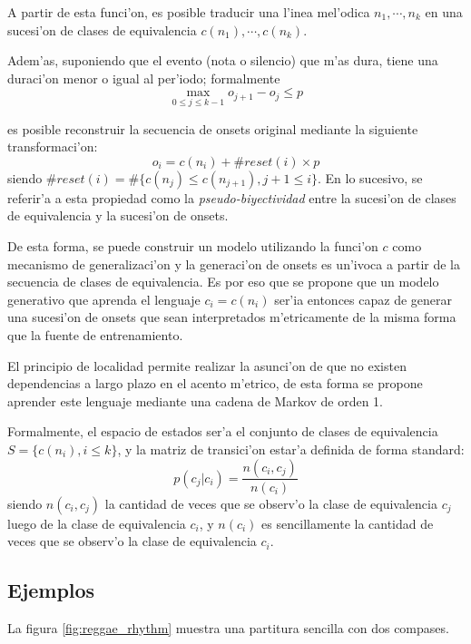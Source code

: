 \begin{imagen}
\end{imagen}

A partir de esta funci'on, es posible traducir una l'inea mel'odica $n_1,\cdots,n_k$ en una sucesi'on de clases de equivalencia $c(n_1),\cdots,c(n_k)$. 

Adem'as, suponiendo que el evento (nota o silencio) que m'as dura, tiene una duraci'on menor o igual al per'iodo; formalmente 
$$\max_{0\leq j \leq k-1}o_{j+1}-o_j \leq p$$ 

es posible reconstruir la secuencia de onsets original mediante la siguiente transformaci'on:
$$o_i=c(n_i) + \#reset(i)\times p$$ siendo $\#reset(i)=\#\{c(n_j) \leq c(n_{j+1}), j+1 \leq i\}$. 
En lo sucesivo, se referir'a a esta propiedad como la \emph{pseudo-biyectividad} entre la sucesi'on de clases de equivalencia y la sucesi'on de onsets.

De esta forma, se puede construir un modelo utilizando la funci'on $c$ como mecanismo de generalizaci'on y la generaci'on de onsets es un'ivoca a partir de la secuencia de 
clases de equivalencia. Es por eso que se propone que un modelo generativo que aprenda el lenguaje $c_i=c(n_i)$ ser'ia entonces capaz de generar una sucesi'on de onsets 
que sean interpretados m'etricamente de la misma forma que la fuente de entrenamiento. 

El principio de localidad permite realizar la asunci'on de que no existen dependencias a largo plazo en el acento m'etrico, de esta forma se propone aprender este lenguaje mediante
una cadena de Markov de orden 1. 

Formalmente, el espacio de estados ser'a el conjunto de clases de equivalencia $S=\{c(n_i), i\leq k \}$, y la matriz de transici'on estar'a definida de forma standard:
$$p(c_j|c_i) = \frac{n(c_i, c_j)}{n(c_i)}$$
siendo $n(c_i, c_j)$ la cantidad de veces que se observ'o la clase de equivalencia $c_j$ luego de la clase de equivalencia $c_i$, y $n(c_i)$ es sencillamente la cantidad de 
veces que se observ'o la clase de equivalencia $c_i$.

\subsection{Ejemplos}
La figura \ref{fig:reggae_rhythm}  muestra una partitura sencilla con dos compases.
\begin{imagen}
\end{imagen}

